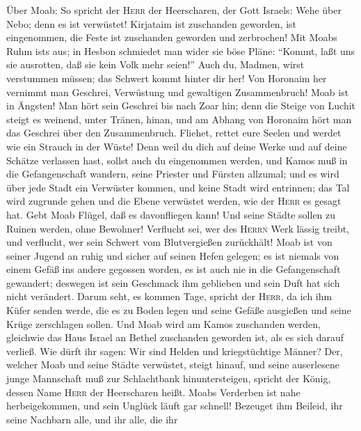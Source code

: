  Über Moab: So spricht der \textsc{Herr} der Heerscharen,
der Gott Israels: Wehe über Nebo; denn es ist verwüstet! Kirjataim ist
zuschanden geworden, ist eingenommen, die Feste ist zuschanden geworden
und zerbrochen!  Mit Moabs Ruhm ist\textquotesingle s aus;
in Hesbon schmiedet man wider sie böse Pläne: ``Kommt, laßt uns sie
ausrotten, daß sie kein Volk mehr seien!'' Auch du, Madmen, wirst
verstummen müssen; das Schwert kommt hinter dir her!  Von
Horonaim her vernimmt man Geschrei, Verwüstung und gewaltigen
Zusammenbruch!  Moab ist in Ängsten! Man hört sein
Geschrei bis nach Zoar hin;  denn die Steige von Luchit
steigt es weinend, unter Tränen, hinan, und am Abhang von Horonaim hört
man das Geschrei über den Zusammenbruch.  Fliehet, rettet
eure Seelen und werdet wie ein Strauch in der Wüste!  Denn
weil du dich auf deine Werke und auf deine Schätze verlassen hast,
sollst auch du eingenommen werden, und Kamos muß in die Gefangenschaft
wandern, seine Priester und Fürsten allzumal;  und es wird
über jede Stadt ein Verwüster kommen, und keine Stadt wird entrinnen;
das Tal wird zugrunde gehen und die Ebene verwüstet werden, wie der
\textsc{Herr} es gesagt hat.  Gebt Moab Flügel, daß es
davonfliegen kann! Und seine Städte sollen zu Ruinen werden, ohne
Bewohner!  Verflucht sei, wer des \textsc{Herrn} Werk
lässig treibt, und verflucht, wer sein Schwert vom Blutvergießen
zurückhält!  Moab ist von seiner Jugend an ruhig und
sicher auf seinen Hefen gelegen; es ist niemals von einem Gefäß ins
andere gegossen worden, es ist auch nie in die Gefangenschaft gewandert;
deswegen ist sein Geschmack ihm geblieben und sein Duft hat sich nicht
verändert.  Darum seht, es kommen Tage, spricht der
\textsc{Herr}, da ich ihm Küfer senden werde, die es zu Boden legen und
seine Gefäße ausgießen und seine Krüge zerschlagen sollen.
 Und Moab wird am Kamos zuschanden werden, gleichwie das
Haus Israel an Bethel zuschanden geworden ist, als es sich darauf
verließ.  Wie dürft ihr sagen: Wir sind Helden und
kriegstüchtige Männer?  Der, welcher Moab und seine
Städte verwüstet, steigt hinauf, und seine auserlesene junge Mannschaft
muß zur Schlachtbank hinuntersteigen, spricht der König, dessen Name
\textsc{Herr} der Heerscharen heißt.  Moabs Verderben ist
nahe herbeigekommen, und sein Unglück läuft gar schnell! 
Bezeuget ihm Beileid, ihr seine Nachbarn alle, und ihr alle, die ihr
